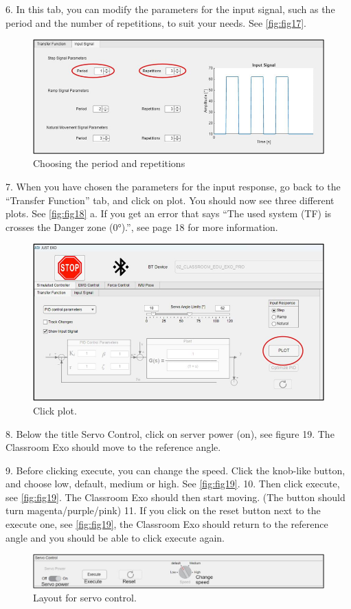 6.	In this tab, you can modify the parameters for the input signal, such as the period and the number of repetitions, to suit your needs. See \autoref{fig:fig17}.
\begin{figure}[H]
	\centering
	\includegraphics[width=0.7\linewidth]{img/fig_17}
	\caption{Choosing the period and repetitions}
	\label{fig:fig17}
\end{figure}


7.	When you have chosen the parameters for the input response, go back to the “Transfer Function” tab, and click on plot. You should now see three different plots. See \autoref{fig:fig18}
a.	If you get an error that says “The used system (TF) is crosses the Danger zone (0°).”, see page 18 for more information.
\begin{figure}[H]
	\centering
	\includegraphics[width=0.7\linewidth]{img/fig_18}
	\caption{Click plot.}
	\label{fig:fig18}
\end{figure}




8.	Below the title Servo Control, click on server power (on), see figure 19. The Classroom Exo should move to the reference angle.

9.	Before clicking execute, you can change the speed. Click the knob-like button, and choose low, default, medium or high. See \autoref{fig:fig19}.
10.	Then click execute, see \autoref{fig:fig19}. The Classroom Exo should then start moving. (The button should turn magenta/purple/pink)
11.	If you click on the reset button next to the execute one, see \autoref{fig:fig19}, the Classroom Exo should return to the reference angle and you should be able to click execute again.
\begin{figure}[H]
	\centering
	\includegraphics[width=1\linewidth]{img/fig_19}
	\caption{Layout for servo control.}
	\label{fig:fig19}
\end{figure}


